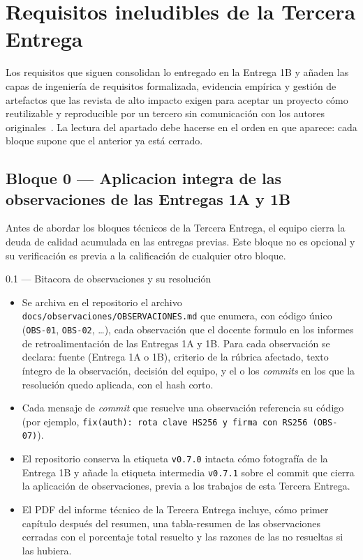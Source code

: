 \documentclass[11pt,a4paper]{article}
\begin{document}
\section{Requisitos ineludibles de la Tercera Entrega}

Los requisitos que siguen consolidan lo entregado en la Entrega 1B y a\~{n}aden las capas de ingenier\'{i}a de requisitos formalizada, evidencia emp\'{i}rica y gesti\'{o}n de artefactos que las revista de alto impacto exigen para aceptar un proyecto c\'{o}mo reutilizable y reproducible por un tercero sin comunicaci\'{o}n con los autores originales~\cite{wilkinson2016fair,acm2020artifact,smith2016software,ralph2021empirical}. La lectura del apartado debe hacerse en el orden en que aparece: cada bloque supone que el anterior ya est\'{a} cerrado.

\subsection{Bloque 0 --- Aplicacion integra de las observaciones de las Entregas 1A y 1B}

Antes de abordar los bloques t\'{e}cnicos de la Tercera Entrega, el equipo cierra la deuda de calidad acumulada en las entregas previas. Este bloque no es opcional y su verificaci\'{o}n es previa a la calificaci\'{o}n de cualquier otro bloque.

\begin{cajaentregable}{0.1 --- Bitacora de observaciones y su resoluci\'{o}n}
    \begin{itemize}
        \item Se archiva en el repositorio el archivo \texttt{docs/observaciones/OBSERVACIONES.md} que enumera, con c\'{o}digo \'{u}nico (\texttt{OBS-01}, \texttt{OBS-02}, \ldots), cada observaci\'{o}n que el docente formulo en los informes de retroalimentaci\'{o}n de las Entregas 1A y 1B. Para cada observaci\'{o}n se declara: fuente (Entrega 1A o 1B), criterio de la r\'{u}brica afectado, texto \'{i}ntegro de la observaci\'{o}n, decisi\'{o}n del equipo, y el o los \emph{commits} en los que la resoluci\'{o}n quedo aplicada, con el hash corto.
        \item Cada mensaje de \emph{commit} que resuelve una observaci\'{o}n referencia su c\'{o}digo (por ejemplo, \texttt{fix(auth): rota clave HS256 y firma con RS256 (OBS-07)}).
        \item El repositorio conserva la etiqueta \texttt{v0.7.0} intacta c\'{o}mo fotograf\'{i}a de la Entrega 1B y a\~{n}ade la etiqueta intermedia \texttt{v0.7.1} sobre el commit que cierra la aplicaci\'{o}n de observaciones, previa a los trabajos de esta Tercera Entrega.
        \item El PDF del informe t\'{e}cnico de la Tercera Entrega incluye, c\'{o}mo primer cap\'{i}tulo despu\'{e}s del resumen, una tabla-resumen de las observaciones cerradas con el porcentaje total resuelto y las razones de las no resueltas si las hubiera.
    \end{itemize}
\end{cajaentregable}
\end{document}
